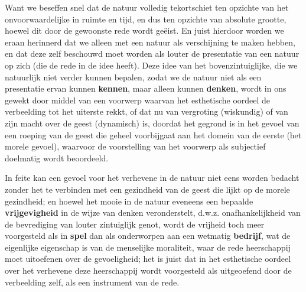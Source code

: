 Want we beseffen snel dat de natuur volledig tekortschiet ten opzichte van het onvoorwaardelijke in ruimte en tijd, en dus ten opzichte van absolute grootte, hoewel dit door de gewoonste rede wordt geëist. En juist hierdoor worden we eraan herinnerd dat we alleen met een natuur als verschijning te maken hebben, en dat deze zelf beschouwd moet worden als louter de presentatie van een natuur op zich (die de rede in de idee heeft). Deze idee van het bovenzintuiglijke, die we natuurlijk niet verder kunnen bepalen, zodat we de natuur niet als een presentatie ervan kunnen \textbf{kennen}, maar alleen kunnen \textbf{denken}, wordt in ons gewekt door middel van een voorwerp waarvan het esthetische oordeel de verbeelding tot het uiterste rekkt, of dat nu van vergroting (wiskundig) of van zijn macht over de geest (dynamisch) is, doordat het gegrond is in het gevoel van een roeping van de geest die geheel voorbijgaat aan het domein van de eerste (het morele gevoel), waarvoor de voorstelling van het voorwerp als subjectief doelmatig wordt beoordeeld.

In feite kan een gevoel voor het verhevene in de natuur niet eens worden bedacht zonder het te verbinden met een gezindheid van de geest die lijkt op de morele gezindheid; en hoewel het mooie in de natuur eveneens een bepaalde \textbf{vrijgevigheid} in de wijze van denken veronderstelt, d.w.z. onafhankelijkheid van de bevrediging van louter zintuiglijk genot, wordt de vrijheid toch meer voorgesteld als in \textbf{spel} dan als onderworpen aan een wetmatig \textbf{bedrijf}, wat de eigenlijke eigenschap is van de menselijke moraliteit, waar de rede heerschappij moet uitoefenen over de gevoeligheid; het is juist dat in het esthetische oordeel over het verhevene deze heerschappij wordt voorgesteld als uitgeoefend door de verbeelding zelf, als een instrument van de rede.

